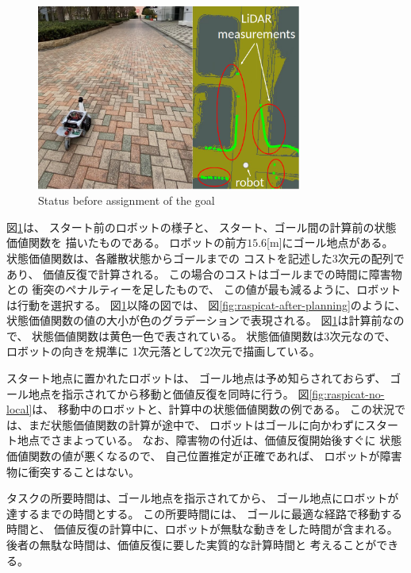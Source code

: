 \documentclass{jarticle}
\begin{document}
\begin{figure}[htb]
  \centering
   \includegraphics[height=61mm]{./figs/raspicat-start.png}
	\caption{Status before assignment of the goal}
	\label{fig:raspicat-start}
\end{figure}

図\ref{fig:raspicat-start}は、
スタート前のロボットの様子と、
スタート、ゴール間の計算前の状態価値関数を
描いたものである。
ロボットの前方$15.6$[m]にゴール地点がある。
状態価値関数は、各離散状態からゴールまでの
コストを記述した3次元の配列であり、
価値反復で計算される。
この場合のコストはゴールまでの時間に障害物との
衝突のペナルティーを足したもので、
この値が最も減るように、ロボットは行動を選択する。
図\ref{fig:raspicat-start}以降の図では、
図\ref{fig:raspicat-after-planning}のように、
状態価値関数の値の大小が色のグラデーションで表現される。
図\ref{fig:raspicat-start}は計算前なので、
状態価値関数は黄色一色で表されている。
状態価値関数は3次元なので、ロボットの向きを規準に
1次元落として2次元で描画している。



スタート地点に置かれたロボットは、
ゴール地点は予め知らされておらず、
ゴール地点を指示されてから移動と価値反復を同時に行う。
図\ref{fig:raspicat-no-local}は、
移動中のロボットと、計算中の状態価値関数の例である。
この状況では、まだ状態価値関数の計算が途中で、
ロボットはゴールに向かわずにスタート地点でさまよっている。
なお、障害物の付近は、価値反復開始後すぐに
状態価値関数の値が悪くなるので、
自己位置推定が正確であれば、
ロボットが障害物に衝突することはない。

タスクの所要時間は、ゴール地点を指示されてから、
ゴール地点にロボットが達するまでの時間とする。
この所要時間には、
ゴールに最適な経路で移動する時間と、
価値反復の計算中に、ロボットが無駄な動きをした時間が含まれる。
後者の無駄な時間は、価値反復に要した実質的な計算時間と
考えることができる。
\end{document}
